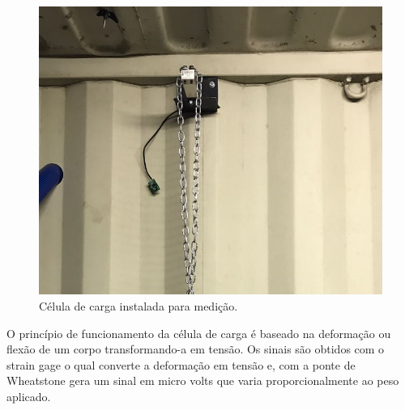 \begin{figure}[h!]
	\centering
	\includegraphics[keepaspectratio=true,scale= 0.6]{figuras/CELULA.png}
	\caption{Célula de carga instalada para medição.}
	\label{celula}
\end{figure}

O princípio de funcionamento da célula de carga é baseado na deformação ou flexão de um corpo transformando-a em tensão. Os sinais são obtidos com o strain gage o qual converte a deformação em tensão e, com a ponte de Wheatstone gera um sinal em micro volts que varia proporcionalmente ao peso aplicado.
